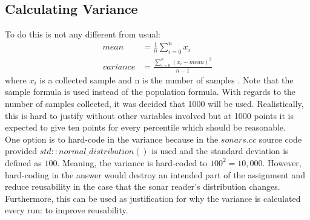 \documentclass{article}
\newcommand\tab[1][1cm]{\hspace*{#1}}
\begin{document}
\subsection{Calculating Variance}
To do this is not any different from usual:
\begin{equation}
    \begin{split}
        mean & = \frac{1}{n} \sum_{i=0}^n{x_i} \\
        variance & = \frac{\sum_{i=0}^n{(x_i - mean)^2}}{n-1}
    \end{split}
\end{equation}
where $x_i$ is a collected sample and n is the number of samples
\cite{variance}. Note that the sample formula is used instead of the population
formula. With regards to the number of samples collected, it was decided that
1000 will be used. Realistically, this is hard to justify without other
variables involved but at 1000 points it is expected to give ten points for
every percentile which should be reasonable.  
\\ \tab One option is to hard-code in the variance because in the $sonars.cc$ 
source code provided $std::normal\_distribution()$ is used and the standard
deviation is defined as $100$. Meaning, the variance is hard-coded to $100^2 =
10,000$. However, hard-coding in the answer would destroy an intended part of
the assignment and reduce reusability in the case that the sonar reader's
distribution changes. Furthermore, this can be used as justification for why the
variance is calculated every run: to improve reusability.
\end{document}
